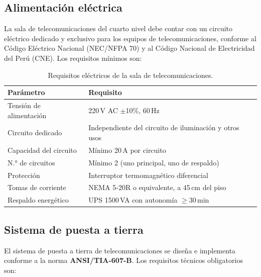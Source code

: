 \subsection{Alimentación eléctrica}

La sala de telecomunicaciones del cuarto nivel debe contar con un circuito
eléctrico dedicado y exclusivo para los equipos de telecomunicaciones, conforme
al Código Eléctrico Nacional (NEC/NFPA 70) y al Código Nacional de Electricidad
del Perú (CNE). Los requisitos mínimos son:

\begin{table}[H]
    \centering
    \caption{Requisitos eléctricos de la sala de telecomunicaciones.}
    \label{tab:electrico}
    \begin{tabular}{|p{5cm}|p{8.5cm}|}
        \hline
        \textbf{Parámetro} & \textbf{Requisito} \\
        \hline
        Tensión de alimentación  & 220\,V AC $\pm$10\%, 60\,Hz \\
        \hline
        Circuito dedicado        & Independiente del circuito de iluminación
                                   y otros usos \\
        \hline
        Capacidad del circuito   & Mínimo 20\,A por circuito \\
        \hline
        N.° de circuitos         & Mínimo 2 (uno principal, uno de respaldo) \\
        \hline
        Protección               & Interruptor termomagnético diferencial \\
        \hline
        Tomas de corriente       & NEMA 5-20R o equivalente, a 45\,cm del piso \\
        \hline
        Respaldo energético      & UPS 1500\,VA con autonomía $\geq$30\,min \\
        \hline
    \end{tabular}
\end{table}%
\nobreak\vspace{-0.3cm}
\subsection{Sistema de puesta a tierra}

El sistema de puesta a tierra de telecomunicaciones se diseña e implementa
conforme a la norma \textbf{\mbox{ANSI/TIA-607-B}}. Los requisitos técnicos
obligatorios son:

